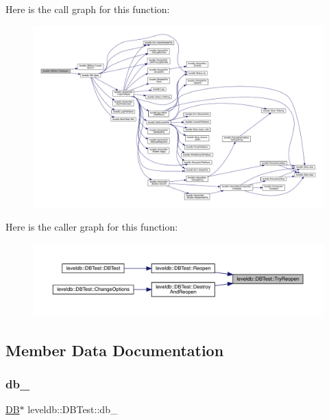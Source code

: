Here is the call graph for this function\+:
\nopagebreak
\begin{figure}[H]
\begin{center}
\leavevmode
\includegraphics[width=350pt]{classleveldb_1_1_d_b_test_aee588b2d13db6be2a651a8fabeac5c79_cgraph}
\end{center}
\end{figure}
Here is the caller graph for this function\+:
\nopagebreak
\begin{figure}[H]
\begin{center}
\leavevmode
\includegraphics[width=350pt]{classleveldb_1_1_d_b_test_aee588b2d13db6be2a651a8fabeac5c79_icgraph}
\end{center}
\end{figure}


\subsection{Member Data Documentation}
\mbox{\label{classleveldb_1_1_d_b_test_a2c3db8773f1aa15128432a87489b0d5a}} 
\subsubsection{\texorpdfstring{db\_}{db\_}}
{\footnotesize\ttfamily \mbox{\hyperlink{classleveldb_1_1_d_b}{DB}}$\ast$ leveldb\+::\+D\+B\+Test\+::db\+\_\+}

